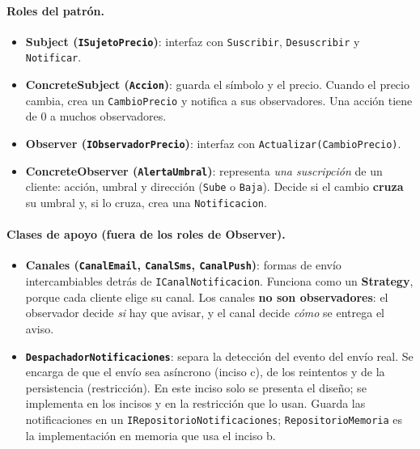 \paragraph{Roles del patrón.}
\begin{itemize}
  \item \textbf{Subject (\texttt{ISujetoPrecio})}: interfaz con \texttt{Suscribir},
        \texttt{Desuscribir} y \texttt{Notificar}.
  \item \textbf{ConcreteSubject (\texttt{Accion})}: guarda el símbolo y el precio. Cuando el
        precio cambia, crea un \texttt{CambioPrecio} y notifica a sus observadores. Una acción
        tiene de 0 a muchos observadores.
  \item \textbf{Observer (\texttt{IObservadorPrecio})}: interfaz con
        \texttt{Actualizar(CambioPrecio)}.
  \item \textbf{ConcreteObserver (\texttt{AlertaUmbral})}: representa \emph{una suscripción}
        de un cliente: acción, umbral y dirección (\texttt{Sube} o \texttt{Baja}). Decide si
        el cambio \textbf{cruza} su umbral y, si lo cruza, crea una \texttt{Notificacion}.
\end{itemize}

\paragraph{Clases de apoyo (fuera de los roles de Observer).}
\begin{itemize}
  \item \textbf{Canales (\texttt{CanalEmail}, \texttt{CanalSms}, \texttt{CanalPush})}: formas
        de envío intercambiables detrás de \texttt{ICanalNotificacion}. Funciona como un
        \textbf{Strategy}, porque cada cliente elige su canal. Los canales \textbf{no son
        observadores}: el observador decide \emph{si} hay que avisar, y el canal decide
        \emph{cómo} se entrega el aviso.
  \item \textbf{\texttt{DespachadorNotificaciones}}: separa la detección del evento del envío
        real. Se encarga de que el envío sea asíncrono (inciso c), de los reintentos y de la
        persistencia (restricción). En este inciso solo se presenta el diseño; se implementa
        en los incisos y en la restricción que lo usan. Guarda las notificaciones en un
        \texttt{IRepositorioNotificaciones}; \texttt{RepositorioMemoria} es la implementación
        en memoria que usa el inciso b.
\end{itemize}

